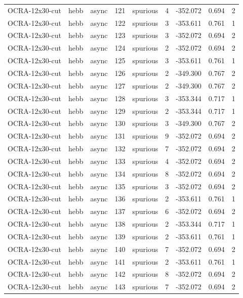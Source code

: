 \begin{tabular}{lllrlrrrr}
OCRA-12x30-cut & hebb & async & 121 & spurious & 4 & -352.072 & 0.694 & 2 \\
OCRA-12x30-cut & hebb & async & 122 & spurious & 3 & -353.611 & 0.761 & 1 \\
OCRA-12x30-cut & hebb & async & 123 & spurious & 3 & -352.072 & 0.694 & 2 \\
OCRA-12x30-cut & hebb & async & 124 & spurious & 2 & -352.072 & 0.694 & 2 \\
OCRA-12x30-cut & hebb & async & 125 & spurious & 3 & -353.611 & 0.761 & 1 \\
OCRA-12x30-cut & hebb & async & 126 & spurious & 2 & -349.300 & 0.767 & 2 \\
OCRA-12x30-cut & hebb & async & 127 & spurious & 2 & -349.300 & 0.767 & 2 \\
OCRA-12x30-cut & hebb & async & 128 & spurious & 3 & -353.344 & 0.717 & 1 \\
OCRA-12x30-cut & hebb & async & 129 & spurious & 2 & -353.344 & 0.717 & 1 \\
OCRA-12x30-cut & hebb & async & 130 & spurious & 3 & -349.300 & 0.767 & 2 \\
OCRA-12x30-cut & hebb & async & 131 & spurious & 9 & -352.072 & 0.694 & 2 \\
OCRA-12x30-cut & hebb & async & 132 & spurious & 7 & -352.072 & 0.694 & 2 \\
OCRA-12x30-cut & hebb & async & 133 & spurious & 4 & -352.072 & 0.694 & 2 \\
OCRA-12x30-cut & hebb & async & 134 & spurious & 8 & -352.072 & 0.694 & 2 \\
OCRA-12x30-cut & hebb & async & 135 & spurious & 3 & -352.072 & 0.694 & 2 \\
OCRA-12x30-cut & hebb & async & 136 & spurious & 2 & -353.611 & 0.761 & 1 \\
OCRA-12x30-cut & hebb & async & 137 & spurious & 6 & -352.072 & 0.694 & 2 \\
OCRA-12x30-cut & hebb & async & 138 & spurious & 2 & -353.344 & 0.717 & 1 \\
OCRA-12x30-cut & hebb & async & 139 & spurious & 2 & -353.611 & 0.761 & 1 \\
OCRA-12x30-cut & hebb & async & 140 & spurious & 7 & -352.072 & 0.694 & 2 \\
OCRA-12x30-cut & hebb & async & 141 & spurious & 2 & -353.611 & 0.761 & 1 \\
OCRA-12x30-cut & hebb & async & 142 & spurious & 8 & -352.072 & 0.694 & 2 \\
OCRA-12x30-cut & hebb & async & 143 & spurious & 7 & -352.072 & 0.694 & 2 \\

\end{tabular}
